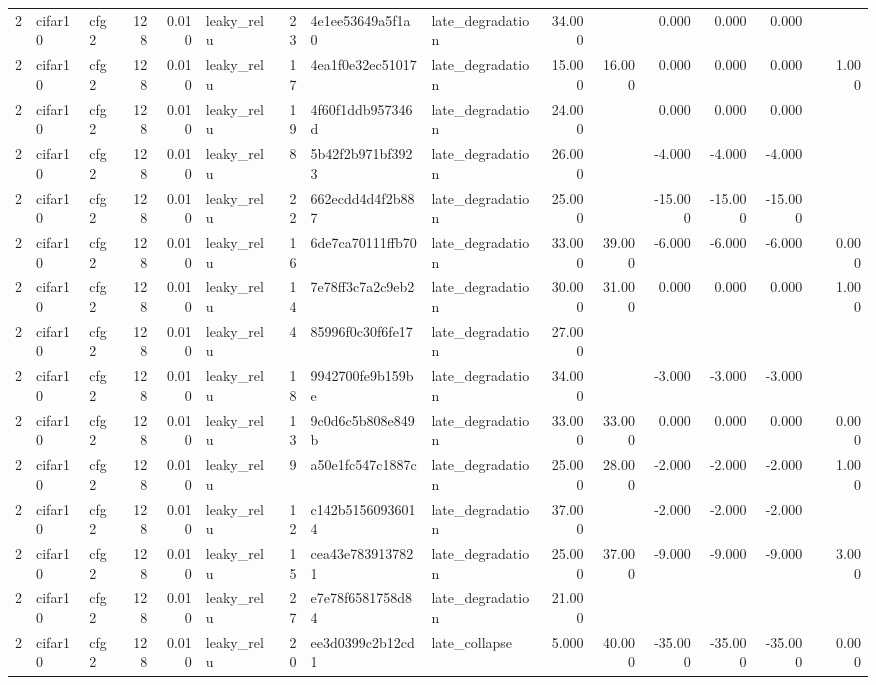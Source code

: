 \begin{table}[htbp]
{\begin{tabular}{@{}rllrrlrllrrrrrrr@{}}
2 & cifar10 & cfg2 & 128 & 0.010 & leaky\_relu & 23 & 4e1ee53649a5f1a0 & late\_degradation & 34.000 &  & 0.000 & 0.000 & 0.000 &  &  \\
2 & cifar10 & cfg2 & 128 & 0.010 & leaky\_relu & 17 & 4ea1f0e32ec51017 & late\_degradation & 15.000 & 16.000 & 0.000 & 0.000 & 0.000 &  & 1.000 \\
2 & cifar10 & cfg2 & 128 & 0.010 & leaky\_relu & 19 & 4f60f1ddb957346d & late\_degradation & 24.000 &  & 0.000 & 0.000 & 0.000 &  &  \\
2 & cifar10 & cfg2 & 128 & 0.010 & leaky\_relu & 8 & 5b42f2b971bf3923 & late\_degradation & 26.000 &  & -4.000 & -4.000 & -4.000 &  &  \\
2 & cifar10 & cfg2 & 128 & 0.010 & leaky\_relu & 22 & 662ecdd4d4f2b887 & late\_degradation & 25.000 &  & -15.000 & -15.000 & -15.000 &  &  \\
2 & cifar10 & cfg2 & 128 & 0.010 & leaky\_relu & 16 & 6de7ca70111ffb70 & late\_degradation & 33.000 & 39.000 & -6.000 & -6.000 & -6.000 &  & 0.000 \\
2 & cifar10 & cfg2 & 128 & 0.010 & leaky\_relu & 14 & 7e78ff3c7a2c9eb2 & late\_degradation & 30.000 & 31.000 & 0.000 & 0.000 & 0.000 &  & 1.000 \\
2 & cifar10 & cfg2 & 128 & 0.010 & leaky\_relu & 4 & 85996f0c30f6fe17 & late\_degradation & 27.000 &  &  &  &  &  &  \\
2 & cifar10 & cfg2 & 128 & 0.010 & leaky\_relu & 18 & 9942700fe9b159be & late\_degradation & 34.000 &  & -3.000 & -3.000 & -3.000 &  &  \\
2 & cifar10 & cfg2 & 128 & 0.010 & leaky\_relu & 13 & 9c0d6c5b808e849b & late\_degradation & 33.000 & 33.000 & 0.000 & 0.000 & 0.000 &  & 0.000 \\
2 & cifar10 & cfg2 & 128 & 0.010 & leaky\_relu & 9 & a50e1fc547c1887c & late\_degradation & 25.000 & 28.000 & -2.000 & -2.000 & -2.000 &  & 1.000 \\
2 & cifar10 & cfg2 & 128 & 0.010 & leaky\_relu & 12 & c142b51560936014 & late\_degradation & 37.000 &  & -2.000 & -2.000 & -2.000 &  &  \\
2 & cifar10 & cfg2 & 128 & 0.010 & leaky\_relu & 15 & cea43e7839137821 & late\_degradation & 25.000 & 37.000 & -9.000 & -9.000 & -9.000 &  & 3.000 \\
2 & cifar10 & cfg2 & 128 & 0.010 & leaky\_relu & 27 & e7e78f6581758d84 & late\_degradation & 21.000 &  &  &  &  &  &  \\
2 & cifar10 & cfg2 & 128 & 0.010 & leaky\_relu & 20 & ee3d0399c2b12cd1 & late\_collapse & 5.000 & 40.000 & -35.000 & -35.000 & -35.000 &  & 0.000 \\

\end{tabular}}
\end{table}
